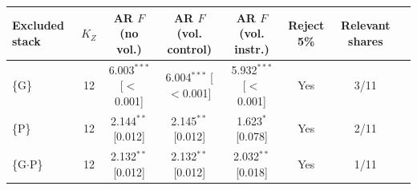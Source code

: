 \begin{tabular}{@{}lccccccc@{}}
\toprule
Excluded stack & $K_Z$ & AR $F$ (no vol.) & AR $F$ (vol. control) & AR $F$ (vol. instr.) & Reject 5\% & Relevant shares \\
\midrule
\{G\} & 12 & 6.003$^{***}$ [$<$0.001] & 6.004$^{***}$ [$<$0.001] & 5.932$^{***}$ [$<$0.001] & Yes & 3/11 \\
\{P\} & 12 & 2.144$^{**}$ [0.012] & 2.145$^{**}$ [0.012] & 1.623$^{*}$ [0.078] & Yes & 2/11 \\
\{G$\cdot$P\} & 12 & 2.132$^{**}$ [0.012] & 2.132$^{**}$ [0.012] & 2.032$^{**}$ [0.018] & Yes & 1/11 \\
\bottomrule
\end{tabular}
